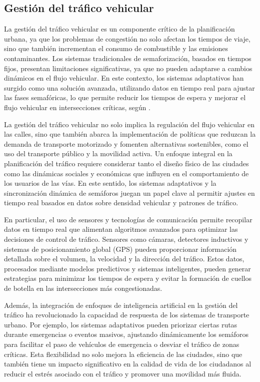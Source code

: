 \subsection{Gestión del tráfico vehicular}
La gestión del tráfico vehicular es un componente crítico de la planificación urbana, ya que los problemas de congestión no solo afectan los tiempos de viaje, sino que también incrementan el consumo de combustible y las emisiones contaminantes. Los sistemas tradicionales de semaforización, basados en tiempos fijos, presentan limitaciones significativas, ya que no pueden adaptarse a cambios dinámicos en el flujo vehicular. En este contexto, los sistemas adaptativos han surgido como una solución avanzada, utilizando datos en tiempo real para ajustar las fases semafóricas, lo que permite reducir los tiempos de espera y mejorar el flujo vehicular en intersecciones críticas, según \cite{SustainableTraffic2020}.

La gestión del tráfico vehicular no solo implica la regulación del flujo vehicular en las calles, sino que también abarca la implementación de políticas que reduzcan la demanda de transporte motorizado y fomenten alternativas sostenibles, como el uso del transporte público y la movilidad activa. Un enfoque integral en la planificación del tráfico requiere considerar tanto el diseño físico de las ciudades como las dinámicas sociales y económicas que influyen en el comportamiento de los usuarios de las vías. En este sentido, los sistemas adaptativos y la sincronización dinámica de semáforos juegan un papel clave al permitir ajustes en tiempo real basados en datos sobre densidad vehicular y patrones de tráfico.

En particular, el uso de sensores y tecnologías de comunicación permite recopilar datos en tiempo real que alimentan algoritmos avanzados para optimizar las decisiones de control de tráfico. Sensores como cámaras, detectores inductivos y sistemas de posicionamiento global (GPS) pueden proporcionar información detallada sobre el volumen, la velocidad y la dirección del tráfico. Estos datos, procesados mediante modelos predictivos y sistemas inteligentes, pueden generar estrategias para minimizar los tiempos de espera y evitar la formación de cuellos de botella en las intersecciones más congestionadas.

Además, la integración de enfoques de inteligencia artificial en la gestión del tráfico ha revolucionado la capacidad de respuesta de los sistemas de transporte urbano. Por ejemplo, los sistemas adaptativos pueden priorizar ciertas rutas durante emergencias o eventos masivos, ajustando dinámicamente los semáforos para facilitar el paso de vehículos de emergencia o desviar el tráfico de zonas críticas. Esta flexibilidad no solo mejora la eficiencia de las ciudades, sino que también tiene un impacto significativo en la calidad de vida de los ciudadanos al reducir el estrés asociado con el tráfico y promover una movilidad más fluida.

